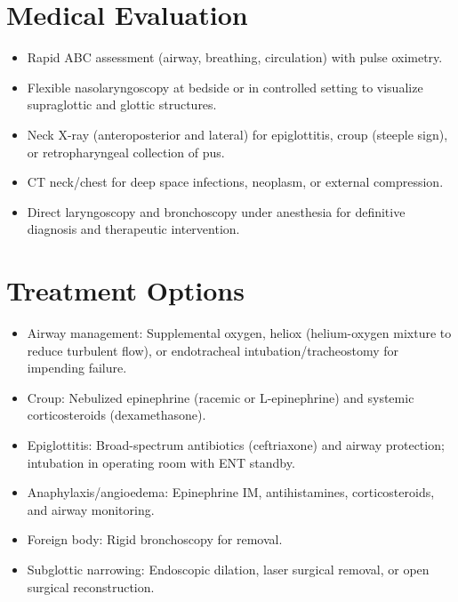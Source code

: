 \section*{Medical Evaluation}
\begin{itemize}
  \item Rapid ABC assessment (airway, breathing, circulation) with pulse oximetry.
  \item Flexible nasolaryngoscopy at bedside or in controlled setting to visualize supraglottic and glottic structures.
  \item Neck X-ray (anteroposterior and lateral) for epiglottitis, croup (steeple sign), or retropharyngeal collection of pus.
  \item CT neck/chest for deep space infections, neoplasm, or external compression.
  \item Direct laryngoscopy and bronchoscopy under anesthesia for definitive diagnosis and therapeutic intervention.
\end{itemize}

\section*{Treatment Options}
\begin{itemize}
  \item Airway management: Supplemental oxygen, heliox (helium-oxygen mixture to reduce turbulent flow), or endotracheal intubation/tracheostomy for impending failure.
  \item Croup: Nebulized epinephrine (racemic or L-epinephrine) and systemic corticosteroids (dexamethasone).
  \item Epiglottitis: Broad-spectrum antibiotics (ceftriaxone) and airway protection; intubation in operating room with ENT standby.
  \item Anaphylaxis/angioedema: Epinephrine IM, antihistamines, corticosteroids, and airway monitoring.
  \item Foreign body: Rigid bronchoscopy for removal.
  \item Subglottic narrowing: Endoscopic dilation, laser surgical removal, or open surgical reconstruction.
\end{itemize}

